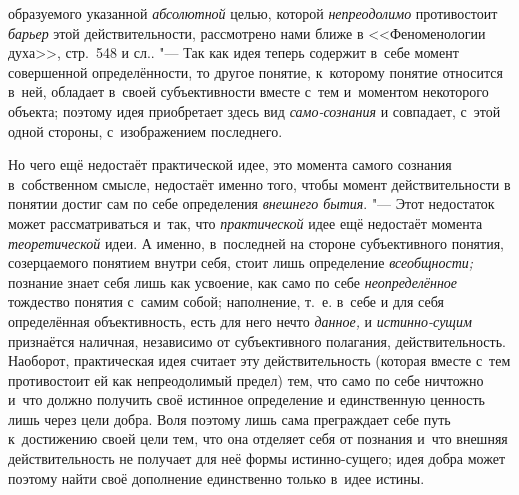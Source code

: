 образуемого указанной {\em абсолютной}
целью, которой
{\em непреодолимо}
противостоит {\em барьер}
этой действительности, рассмотрено нами ближе в
<<Феноменологии духа>>, стр.~548 и
сл..
"--- Так как идея теперь содержит в~себе момент совершенной
определённости, то другое понятие, к~которому понятие относится в~ней,
обладает в~своей субъективности вместе с~тем и~моментом некоторого объекта;
поэтому идея приобретает здесь вид
{\em само-сознания}
и совпадает, с~этой одной стороны, с~изображением
последнего.

Но чего ещё недостаёт практической идее, это момента самого
сознания в~собственном
смысле,
недостаёт именно того, чтобы момент действительности в
понятии достиг сам по себе определения
{\em внешнего бытия}. "---
Этот недостаток может рассматриваться и~так, что
{\em практической} идее
ещё недостаёт момента
{\em теоретической} идеи.
А именно, в~последней на стороне субъективного понятия, созерцаемого
понятием внутри себя, стоит лишь определение
{\em всеобщности;}
познание знает себя лишь как усвоение, как само по себе
{\em неопределённое}
тождество понятия с~самим собой; наполнение, т.~е. в~себе и
для себя определённая объективность, есть для него нечто
{\em данное,} и
{\em истинно-сущим}
признаётся наличная, независимо от субъективного полагания,
действительность. Наоборот, практическая идея считает эту действительность
(которая вместе с~тем противостоит ей как непреодолимый предел) тем, что
само по себе ничтожно и~что должно получить своё истинное определение и
единственную ценность лишь через цели добра. Воля поэтому лишь сама
преграждает себе путь к~достижению своей цели тем, что она отделяет себя от
познания и~что внешняя действительность не получает для неё формы
истинно-сущего; идея добра может поэтому найти своё дополнение единственно
только в~идее истины.

